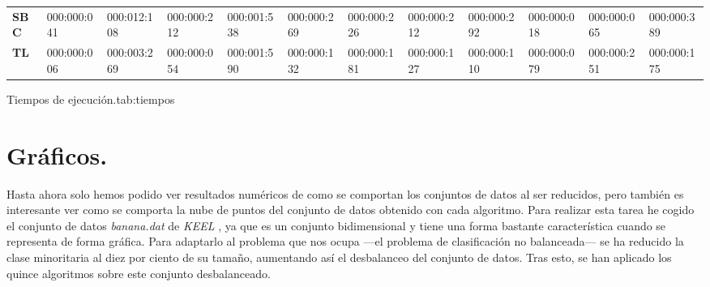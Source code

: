 {{\begin{tabular}{llllllllllll}
\textbf{SBC}                  & 000:000:041                                                                            & 000:012:108                                                                          & 000:000:212                         & 000:001:538                           & 000:000:269                                                                                      & 000:000:226                           & 000:000:212                           & 000:000:292                           & 000:000:018                            & 000:000:065                         & 000:000:389                                                                          \\
\textbf{TL}                   & 000:000:006                                                                            & 000:003:269                                                                          & 000:000:054                         & 000:001:590                           & 000:000:132                                                                                      & 000:000:181                           & 000:000:127                           & 000:000:110                           & 000:000:079                            & 000:000:251                         & 000:000:175                                                                         
\end{tabular}}}%
{Tiempos de ejecución.}{tab:tiempos}

\newpage

\section{Gráficos.} \label{sec:resultados_graficos}

Hasta ahora solo hemos podido ver resultados numéricos de como se comportan los conjuntos de datos al ser reducidos, pero también es interesante ver como se comporta la nube de puntos del conjunto de datos obtenido con cada algoritmo. Para realizar esta tarea he cogido el conjunto de datos \textit{banana.dat} \cite{banana} de \textit{KEEL} \cite{keel} \cite{keelweb}, ya que es un conjunto bidimensional y tiene una forma bastante característica cuando se representa de forma gráfica. Para adaptarlo al problema que nos ocupa —el problema de clasificación no balanceada— se ha reducido la clase minoritaria al diez por ciento de su tamaño, aumentando así el desbalanceo del conjunto de datos. Tras esto, se han aplicado los quince algoritmos sobre este conjunto desbalanceado. \\

